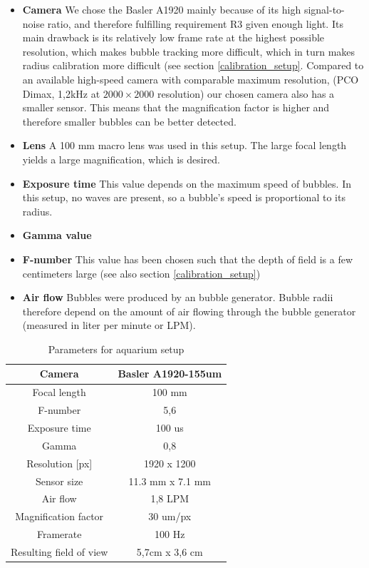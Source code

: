 		\begin{itemize}
		\item \textbf{Camera} We chose the Basler A1920 mainly because of its high signal-to-noise ratio, and therefore fulfilling requirement R3 given enough light. Its main drawback is its relatively low frame rate at the highest possible resolution, which makes bubble tracking more difficult, which in turn makes radius calibration more difficult (see section \ref{calibration_setup}. Compared to an available high-speed camera with comparable maximum resolution, (PCO Dimax, 1,2kHz at $2000 \times 2000$ resolution) our chosen camera also has a smaller sensor. This means that the magnification factor is higher and therefore smaller bubbles can be better detected.
		
		\item \textbf{Lens} A 100 mm macro lens was used in this setup. The large focal length yields a large magnification, which is desired.
		\item \textbf{Exposure time} This value depends on the maximum speed of bubbles. In this setup, no waves are present, so a bubble's speed is proportional to its radius. 
		\item \textbf{Gamma value}
		\item \textbf{F-number} This value has been chosen such that the depth of field is a few centimeters large (see also section \ref{calibration_setup})		
		\item \textbf{Air flow} Bubbles were produced by an bubble generator. Bubble radii therefore depend on the amount of air flowing through the bubble generator (measured in liter per minute or LPM).
		\end{itemize}
		
		\begin{table}
			\centering
		
			\begin{tabular}{|c|c|}
			\hline 
			Camera & Basler A1920-155um \\ 
			\hline 
			Focal length & 100 mm \\ 
			\hline 
			F-number & 5,6 \\ 
			\hline 
			Exposure time & 100 us \\ 
			\hline 
			Gamma & 0,8 \\
			\hline
			Resolution [px] &1920 x 1200 \\
			\hline 
			Sensor size & 11.3 mm x 7.1 mm \\
			\hline
			Air flow & 1,8 LPM \\ 
			\hline 
			Magnification factor & 30 um/px \\ 
			\hline 
			Framerate & 100 Hz \\ 
			\hline 
			Resulting field of view & 5,7cm x 3,6 cm \\
			\hline
			\end{tabular} 
			
			\caption{Parameters for aquarium setup}
			\label{tab:aquarium_param}

		\end{table}
		
